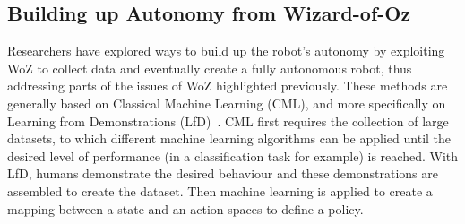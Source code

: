 \documentclass[manuscript, review, anonymous]{acmart}
\begin{document}
\subsection{Building up Autonomy from Wizard-of-Oz} \label{sec:cml}



Researchers have explored ways to build up the robot's autonomy by exploiting
WoZ to collect data and eventually create a fully autonomous robot,
thus addressing parts of the issues of WoZ highlighted previously. These methods are
generally based on Classical Machine Learning (CML), and more specifically	on
Learning from Demonstrations (LfD)~\cite{argall2009survey,billard2008robot}. CML
first requires the collection of large datasets, to which different machine 
learning algorithms can be applied until the desired level of performance (in a
classification task for example) is reached.  With LfD, humans demonstrate the
desired behaviour and these demonstrations are assembled to create the dataset.
Then machine learning is applied to create a mapping between a state and an
action spaces to define a policy. %
\end{document}
